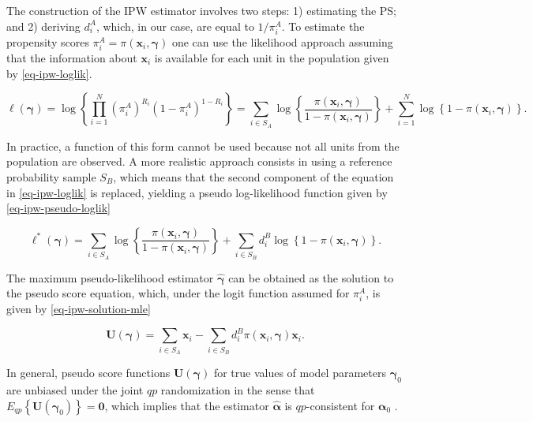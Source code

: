\documentclass[
]{jss}
\begin{document}
The construction of the IPW estimator involves two steps: 1) estimating
the PS; and 2) deriving \(d_i^A\), which, in our case, are equal to
\(1/\pi_i^A\). To estimate the propensity scores
\(\pi_i^A=\pi(\boldsymbol{x}_i, \boldsymbol{\gamma})\) one can use the
likelihood approach assuming that the information about
\(\boldsymbol{x}_i\) is available for each unit in the population given
by \eqref{eq-ipw-loglik}.

\begin{equation}
\ell(\boldsymbol{\gamma}) = \log\left\{\prod_{i=1}^N \left(\pi_i^A\right)^{R_i}\left(1-\pi_i^A\right)^{1-R_i}\right\} =
\sum_{i \in S_{A}} \log \left\{\frac{\pi\left(\boldsymbol{x}_i, \boldsymbol{\gamma}\right)}{1-\pi\left(\boldsymbol{x}_i, \boldsymbol{\gamma}\right)}\right\}+\sum_{i=1}^N \log \left\{1-\pi\left(\boldsymbol{x}_i, \boldsymbol{\gamma}\right)\right\}.
\label{eq-ipw-loglik}
\end{equation}

In practice, a function of this form cannot be used because not all
units from the population are observed. A more realistic approach
consists in using a reference probability sample \(S_B\), which means
that the second component of the equation in \eqref{eq-ipw-loglik} is
replaced, yielding a pseudo log-likelihood function given by
\eqref{eq-ipw-pseudo-loglik}

\begin{equation}
\ell^*(\boldsymbol{\gamma}) = \sum_{i \in S_{A}} \log \left\{\frac{\pi\left(\boldsymbol{x}_i, \boldsymbol{\gamma}\right)}{1-\pi\left(\boldsymbol{x}_i, \boldsymbol{\gamma}\right)}\right\}+ \sum_{i \in S_{B}} d_i^B \log \left\{1-\pi\left(\boldsymbol{x}_i, \boldsymbol{\gamma}\right)\right\}.
\label{eq-ipw-pseudo-loglik}
\end{equation}

The maximum pseudo-likelihood estimator \(\hat{\boldsymbol{\gamma}}\)
can be obtained as the solution to the pseudo score equation, which,
under the logit function assumed for \(\pi_i^A\), is given by
\eqref{eq-ipw-solution-mle}

\begin{equation}
\boldsymbol{U}(\boldsymbol{\gamma}) = \sum_{i \in S_A} \boldsymbol{x}_i - \sum_{i \in S_B} d_i^B \pi(\boldsymbol{x}_i, \boldsymbol{\gamma}) \boldsymbol{x}_i.
\label{eq-ipw-solution-mle}
\end{equation}

In general, pseudo score functions
\(\boldsymbol{U}(\boldsymbol{\gamma})\) for true values of model
parameters \(\boldsymbol{\gamma}_0\) are unbiased under the joint
\(q p\) randomization in the sense that
\(E_{q p}\left\{\boldsymbol{U}\left(\boldsymbol{\gamma}_0\right)\right\}=\boldsymbol{0}\),
which implies that the estimator \(\hat{\boldsymbol{\alpha}}\) is
\(qp\)-consistent for \(\boldsymbol{\alpha}_0\)
\citep{wu2022statistical}.
\end{document}
